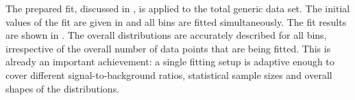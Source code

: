 The prepared fit, discussed in , is applied to the total generic \MC data set.
The initial values of the fit are given in  and all bins are fitted simultaneously.
The fit results are shown in .
The overall \Mbc distributions are accurately described for all \EB bins, irrespective of the overall number of data points that are being fitted.
This is already an important achievement: a single fitting setup is adaptive enough to cover different signal-to-background ratios, statistical sample sizes and overall shapes of the distributions.
\begin{figure}[htbp!]
    \centering
\end{figure}
